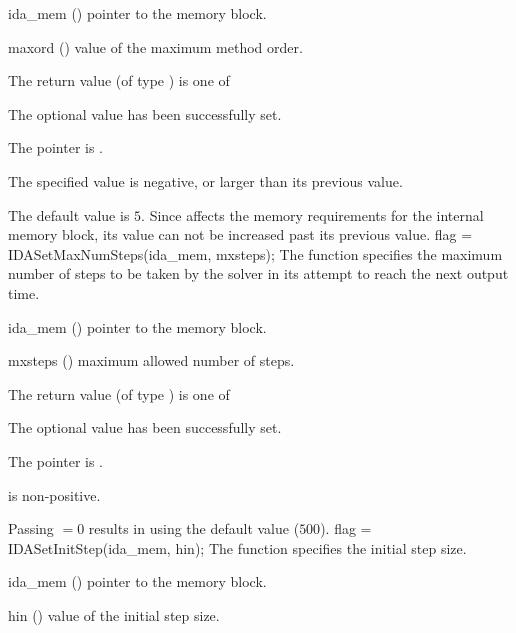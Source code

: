 {
  \begin{args}
  \item[ida\_mem] ()
    pointer to the {\ida} memory block.
  \item[maxord] ()
    value of the maximum method order.
  \end{args}
}
{
  The return value  (of type ) is one of
  \begin{args}
  \item[\Id{IDA\_SUCCESS}] 
    The optional value has been successfully set.
  \item[\Id{IDA\_MEM\_NULL}]
    The  pointer is .
  \item[\Id{IDA\_ILL\_INPUT}]
    The specified value  is negative, or larger than 
    its previous value.
  \end{args}
}
{
  The default value is $5$.
  Since  affects the memory requirements
  for the internal {\ida} memory block, its value
  can not be increased past its previous value.
}
{
flag = IDASetMaxNumSteps(ida\_mem, mxsteps);
}
{
  The function  specifies the maximum number
  of steps to be taken by the solver in its attempt to reach 
  the next output time.
}
{
  \begin{args}
  \item[ida\_mem] ()
    pointer to the {\ida} memory block.
  \item[mxsteps] ()
    maximum allowed number of steps.
  \end{args}
}
{
  The return value  (of type ) is one of
  \begin{args}
  \item[\Id{IDA\_SUCCESS}] 
    The optional value has been successfully set.
  \item[\Id{IDA\_MEM\_NULL}]
    The  pointer is .
  \item[\Id{IDA\_ILL\_INPUT}]
     is non-positive.
  \end{args}
}
{
  Passing $=0$ results in {\ida} using the default value ($500$).
}
{
flag = IDASetInitStep(ida\_mem, hin);
}
{
  The function  specifies the initial step size.
}
{
  \begin{args}
  \item[ida\_mem] ()
    pointer to the {\ida} memory block.
  \item[hin] ()
    value of the initial step size.
  \end{args}
}
